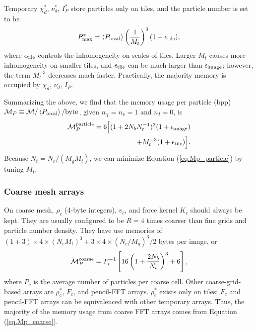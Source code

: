 \documentclass[10pt,twocolumn,reprint]{emulateapj}
\begin{document}
Temporary $\chi_d^*$, $\nu_d^*$, $I_P^*$ store particles only on tiles, and the particle number is set to be
\begin{equation}\label{eq.nptile}
	P_{\rm max}^*=\left\langle P_{\rm local} \right\rangle \left( \frac{1}{M_t} \right)^3(1+\epsilon_{\rm tile}),
\end{equation}
where $\epsilon_{\rm tile}$ controls the inhomogeneity on scales of tiles. Larger $M_t$ causes more inhomogeneity on smaller tiles, and $\epsilon_{\rm tile}$ can be much larger than $\epsilon_{\rm image}$; however, the term $M_t^{-3}$ decreases much faster. Practically, the majority memory is occupied by $\chi_d$, $\nu_d$, $I_P$.

Summarizing the above, we find that the memory usage per particle (bpp) ${\mathcal M}_P \equiv {\mathcal M} / \left\langle P_{\rm local} \right\rangle/{\rm byte}$, given $n_\chi=n_\nu=1$ and $n_I=0$, is
\begin{eqnarray}\label{eq.Mp_particle}
\nonumber\mathcal{M}_P^{\rm particle}=6\Big [ (1+2N_b N_t^{-1})^3(1+\epsilon_{\rm image} )\\
	+M_t^{-3}(1+\epsilon_{\rm tile})\Big ].
\end{eqnarray}
Because $N_t=N_c/(M_g M_t)$, we can minimize Equation (\ref{eq.Mp_particle}) by tuning $M_t$.

\subsubsection{Coarse mesh arrays}
On coarse mesh, $\rho_c$ (4-byte integers), $v_c$, and force kernel $K_c$ should always be kept. They are usually configured to be $R=4$ times coarser than fine grids and particle number density. They have use memories of $(1+3)\times 4\times(N_e M_t)^3+3\times 4\times(N_c/M_g)^3/2$ bytes per image, or
\begin{equation}\label{eq.Mp_coarse}
	\mathcal{M}_P^{\rm coarse}=P_c^{-1} \left [ 16\left( 1+\frac{2N_b}{N_t} \right)^3+6 \right ],
\end{equation}
where $P_c$ is the average number of particles per coarse cell. Other coarse-grid-based arrays are $\rho_c^*$, $F_c$, and pencil-FFT arrays. $\rho_c^*$ exists only on tiles; $F_c$ and pencil-FFT arrays can be equivalenced with other temporary arrays. Thus, the majority of the memory usage from coarse FFT arrays comes from Equation (\ref{eq.Mp_coarse}).
\end{document}
